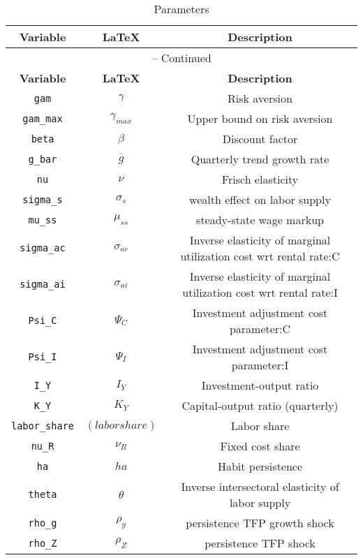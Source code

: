 \begin{center}
\begin{longtable}{ccc}
\caption{Parameters}\\%
\hline%
\multicolumn{1}{c}{\textbf{Variable}} &
\multicolumn{1}{c}{\textbf{\LaTeX}} &
\multicolumn{1}{c}{\textbf{Description}}\\%
\hline\hline%
\endfirsthead
\multicolumn{3}{c}{{\tablename} \thetable{} -- Continued}\\%
\hline%
\multicolumn{1}{c}{\textbf{Variable}} &
\multicolumn{1}{c}{\textbf{\LaTeX}} &
\multicolumn{1}{c}{\textbf{Description}}\\%
\hline\hline%
\endhead
\texttt{gam} & ${\gamma}$ & Risk aversion\\
\texttt{gam\_max} & ${\gamma_{max}}$ & Upper bound on risk aversion\\
\texttt{beta} & ${\beta}$ & Discount factor\\
\texttt{g\_bar} & ${\overline{g}}$ & Quarterly trend growth rate\\
\texttt{nu} & $\nu$ & Frisch elasticity\\
\texttt{sigma\_s} & $\sigma_s$ & wealth effect on labor supply\\
\texttt{mu\_ss} & $\mu_{ss}$ & steady-state wage markup\\
\texttt{sigma\_ac} & ${\sigma_{ac}}$ & Inverse elasticity of marginal utilization cost wrt rental rate:C\\
\texttt{sigma\_ai} & ${\sigma_{ai}}$ & Inverse elasticity of marginal utilization cost wrt rental rate:I\\
\texttt{Psi\_C} & ${\Psi_C}$ & Investment adjustment cost parameter:C\\
\texttt{Psi\_I} & ${\Psi_I}$ & Investment adjustment cost parameter:I\\
\texttt{I\_Y} & ${I_Y}$ & Investment-output ratio\\
\texttt{K\_Y} & ${K_Y}$ & Capital-output ratio (quarterly)\\
\texttt{labor\_share} & $(labor share)$ & Labor share\\
\texttt{nu\_R} & ${\nu_R}$ & Fixed cost share\\
\texttt{ha} & ${ha}$ & Habit persistence\\
\texttt{theta} & ${\theta}$ & Inverse intersectoral elasticity of labor supply\\
\texttt{rho\_g} & ${\rho_g}$ & persistence TFP growth shock\\
\texttt{rho\_Z} & ${\rho_Z}$ & persistence TFP shock\\

\end{longtable}
\end{center}

